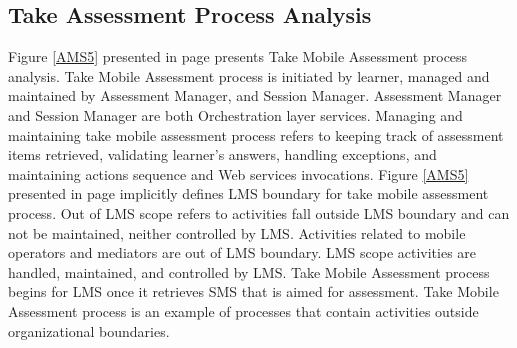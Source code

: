 \documentclass[12pt,a4paper,final,twoside,onecolumn,titlepage]{book}
\begin{document}
\subsection{Take Assessment Process Analysis}
Figure \ref{AMS5} presented in page \pageref{AMS5} presents Take Mobile Assessment process analysis. Take Mobile Assessment process is initiated by learner, managed and maintained by Assessment Manager, and Session Manager. Assessment Manager and Session Manager are both Orchestration layer services. Managing and maintaining take mobile assessment process refers to keeping track of assessment items retrieved, validating learner's answers, handling exceptions, and maintaining actions sequence and Web services invocations. Figure \ref{AMS5} presented in page \pageref{AMS5} implicitly defines \gls{LMS} boundary for take mobile assessment process. Out of \gls{LMS} scope refers to activities fall outside \gls{LMS} boundary and can not be maintained, neither controlled by \gls{LMS}. Activities related to mobile operators and mediators are out of \gls{LMS} boundary. \gls{LMS} scope activities are handled, maintained, and controlled by \gls{LMS}. Take Mobile Assessment process begins for \gls{LMS} once it retrieves SMS that is aimed for assessment. Take Mobile Assessment process is an example of processes that contain activities outside organizational boundaries. 
\end{document}
